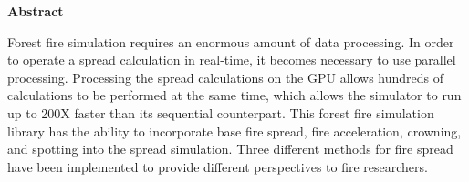 \newpage
{}
\begin{center}
  {\bf Abstract}
\end{center}

Forest fire simulation requires an enormous amount of data processing. In order to operate a spread calculation in real-time, it becomes necessary to use parallel processing. Processing the spread calculations on the GPU allows hundreds of calculations to be performed at the same time, which allows the simulator to run up to 200X faster than its sequential counterpart. This forest fire simulation library has the ability to incorporate base fire spread, fire acceleration, crowning, and spotting into the spread simulation. Three different methods for fire spread have been implemented to provide different perspectives to fire researchers. 